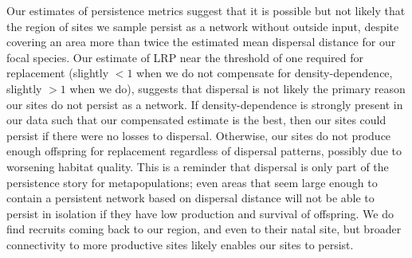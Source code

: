\documentclass[12pt, oneside]{article}   	%
\begin{document}
Our estimates of persistence metrics suggest that it is possible but not likely that the region of sites we sample persist as a network without outside input, despite covering an area more than twice the estimated mean dispersal distance for our focal species. Our estimate of LRP near the threshold of one required for replacement (slightly $ < 1$ when we do not compensate for density-dependence, slightly $ > 1$ when we do), suggests that dispersal is not likely the primary reason our sites do not persist as a network. If density-dependence is strongly present in our data such that our compensated estimate is the best, then our sites could persist if there were no losses to dispersal. Otherwise, our sites do not produce enough offspring for replacement regardless of dispersal patterns, possibly due to worsening habitat quality. This is a reminder that dispersal is only part of the persistence story for metapopulations; even areas that seem large enough to contain a persistent network based on dispersal distance will not be able to persist in isolation if they have low production and survival of offspring. We do find recruits coming back to our region, and even to their natal site, but broader connectivity to more productive sites likely enables our sites to persist.




\end{document}
